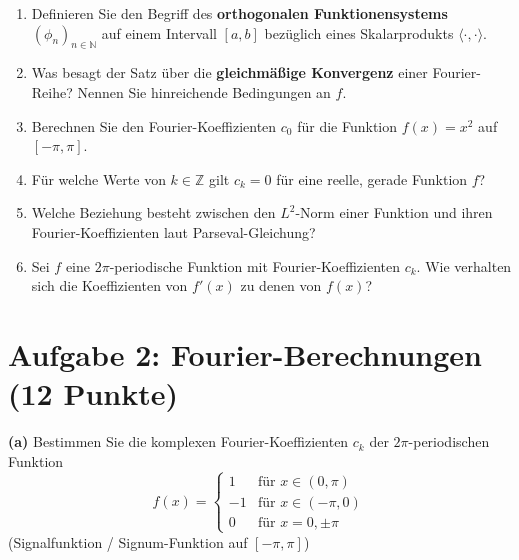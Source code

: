 \begin{enumerate}[label=\arabic*.]
    \item Definieren Sie den Begriff des \textbf{orthogonalen Funktionensystems} $(\phi_n)_{n \in \mathbb{N}}$ auf einem Intervall $[a, b]$ bezüglich eines Skalarprodukts $\langle \cdot, \cdot \rangle$.
    \vspace{0.2cm}
    
    \item Was besagt der Satz über die \textbf{gleichmäßige Konvergenz} einer Fourier-Reihe? Nennen Sie hinreichende Bedingungen an $f$.
    \vspace{0.2cm}
    
    \item Berechnen Sie den Fourier-Koeffizienten $c_0$ für die Funktion $f(x) = x^2$ auf $[-\pi, \pi]$.
    \vspace{0.2cm}
    
    \item Für welche Werte von $k \in \mathbb{Z}$ gilt $c_k = 0$ für eine reelle, gerade Funktion $f$?
    \vspace{0.2cm}
    
    \item Welche Beziehung besteht zwischen den $L^2$-Norm einer Funktion und ihren Fourier-Koeffizienten laut Parseval-Gleichung?
    \vspace{0.2cm}
    
    \item Sei $f$ eine $2\pi$-periodische Funktion mit Fourier-Koeffizienten $c_k$. Wie verhalten sich die Koeffizienten von $f'(x)$ zu denen von $f(x)$?
    \vspace{0.2cm}
\end{enumerate}

\newpage

\section*{Aufgabe 2: Fourier-Berechnungen (12 Punkte)}
\textbf{(a)} Bestimmen Sie die komplexen Fourier-Koeffizienten $c_k$ der $2\pi$-periodischen Funktion
\[
    f(x) = \begin{cases}
        1 & \text{für } x \in (0, \pi) \\
        -1 & \text{für } x \in (-\pi, 0) \\
        0 & \text{für } x = 0, \pm\pi
    \end{cases}
\]
(Signalfunktion / Signum-Funktion auf $[-\pi, \pi]$)

\vspace{0.2cm}


